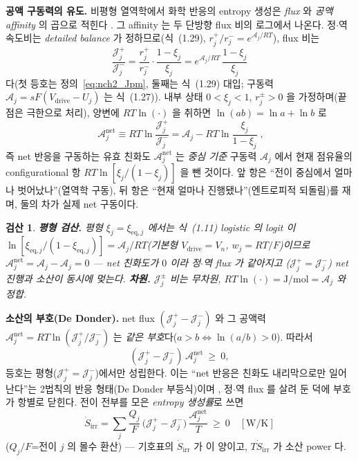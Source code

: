 \documentclass[11pt,a4paper]{article}
\newtheorem*{verifybox}{검산}
\newcommand{\eq}{\mathrm{eq}}
\newcommand{\drive}{\mathrm{drive}}
\newcommand{\irr}{\mathrm{irr}}
\begin{document}
\textbf{공액 구동력의 유도.} 비평형 열역학에서 화학 반응의 entropy 생성은 \emph{flux} 와 \emph{공액 affinity} 의
곱으로 적힌다 \cite{degrootmazur1962,prigogine1967}. 그 affinity 는 두 단방향 flux 비의 로그에서 나온다. 정$\cdot$역
속도비는 \emph{detailed balance} 가 정하므로(식~(1.29), $r_j^+/r_j^-=e^{\mathcal A_j/RT}$), flux 비는
\begin{equation}
\frac{\mathcal J_j^+}{\mathcal J_j^-}=\frac{r_j^+}{r_j^-}\cdot\frac{1-\xi_j}{\xi_j}
=e^{\mathcal A_j/RT}\,\frac{1-\xi_j}{\xi_j}
\label{eq:nch2_Jratio}
\end{equation}
다(첫 등호는 정의~\eqref{eq:nch2_Jpm}, 둘째는 식~(1.29) 대입; 구동력 $\mathcal A_j=sF(V_\drive-U_j)$ 는
식~(1.27)). 내부 상태 $0<\xi_j<1$, $r_j^\pm>0$ 을 가정하며(끝점은 극한으로 처리), 양변에 $RT\ln(\cdot)$ 을
취하면 $\ln(ab)=\ln a+\ln b$ 로
\begin{equation}
\boxed{\;\mathcal A_j^{\mathrm{net}}\equiv RT\ln\frac{\mathcal J_j^+}{\mathcal J_j^-}
=\mathcal A_j-RT\ln\frac{\xi_j}{1-\xi_j}\;,}
\label{eq:nch2_Anet}
\end{equation}
즉 net 반응을 구동하는 유효 친화도 $\mathcal A_j^{\mathrm{net}}$ 는 \emph{중심 기준} 구동력 $\mathcal A_j$ 에서
현재 점유율의 configurational 항 $RT\ln[\xi_j/(1-\xi_j)]$ 을 뺀 것이다. 앞 항은 ``전이 중심에서 얼마나 벗어났나''(열역학 구동), 뒤 항은 ``현재 얼마나 진행됐나''(엔트로피적 되돌림)를 재며, 둘의 차가 실제 net 구동이다.

\begin{verifybox}
\textbf{평형 검산.} 평형 $\xi_j=\xi_{\eq,j}$ 에서는 식~(1.11) logistic 의 logit 이
$\ln[\xi_{\eq,j}/(1-\xi_{\eq,j})]=\mathcal A_j/RT$(기본형 $V_\drive=V_n$, $w_j=RT/F$)이므로
$\mathcal A_j^{\mathrm{net}}=\mathcal A_j-\mathcal A_j=0$ — net 친화도가 $0$ 이라 정$\cdot$역 flux 가 같아지고
($\mathcal J_j^+=\mathcal J_j^-$) net 진행과 소산이 동시에 멎는다. \textbf{차원.} $\mathcal J_j^\pm$ 비는 무차원,
$RT\ln(\cdot)=\mathrm{J/mol}=\mathcal A_j$ 와 정합.
\end{verifybox}

\textbf{소산의 부호(De Donder).} net flux $(\mathcal J_j^+-\mathcal J_j^-)$ 와 그 공액력 $\mathcal A_j^{\mathrm{net}}
=RT\ln(\mathcal J_j^+/\mathcal J_j^-)$ 는 \emph{같은 부호}다($a>b\Leftrightarrow\ln(a/b)>0$). 따라서
\begin{equation}
(\mathcal J_j^+-\mathcal J_j^-)\,\mathcal A_j^{\mathrm{net}}\ \ge\ 0,
\label{eq:nch2_dedonder}
\end{equation}
등호는 평형($\mathcal J_j^+=\mathcal J_j^-$)에서만 성립한다. 이는 ``net 반응은 친화도 내리막으로만 일어난다''는
2법칙의 반응 형태(De Donder 부등식)이며 \cite{degrootmazur1962}, 정$\cdot$역 flux 를 살려 둔 덕에 부호가 항별로
닫힌다. 전이 전부를 모은 \emph{entropy 생성률}로 쓰면
\begin{equation}
\dot S_\irr=\sum_j\frac{Q_j}{F}\,\big(\mathcal J_j^+-\mathcal J_j^-\big)\,\frac{\mathcal A_j^{\mathrm{net}}}{T}\ \ge\ 0
\quad[\mathrm{W/K}]
\label{eq:nch2_sirr}
\end{equation}
($Q_j/F$=전이 $j$ 의 몰수 환산) — 기호표의 $\dot S_\irr$ 가 이 양이고, $T\dot S_\irr$ 가 소산 power 다.
\end{document}
